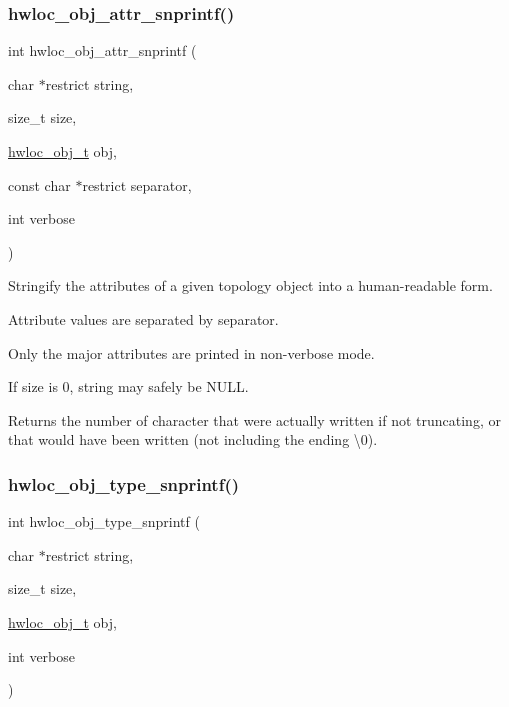 \subsubsection{\texorpdfstring{hwloc\+\_\+obj\+\_\+attr\+\_\+snprintf()}{hwloc\_obj\_attr\_snprintf()}}
{\footnotesize\ttfamily int hwloc\+\_\+obj\+\_\+attr\+\_\+snprintf (\begin{DoxyParamCaption}\item[{char $\ast$restrict}]{string,  }\item[{size\+\_\+t}]{size,  }\item[{\hyperlink{a00185_ga79b8ab56877ef99ac59b833203391c7d}{hwloc\+\_\+obj\+\_\+t}}]{obj,  }\item[{const char $\ast$restrict}]{separator,  }\item[{int}]{verbose }\end{DoxyParamCaption})}



Stringify the attributes of a given topology object into a human-\/readable form. 

Attribute values are separated by {\ttfamily separator}.

Only the major attributes are printed in non-\/verbose mode.

If {\ttfamily size} is 0, {\ttfamily string} may safely be {\ttfamily N\+U\+LL}.

\begin{DoxyReturn}{Returns}
the number of character that were actually written if not truncating, or that would have been written (not including the ending \textbackslash{}0). 
\end{DoxyReturn}
\mbox{\label{a00188_gadb8765c260edea80c52cd06a76639ba4}} 
\subsubsection{\texorpdfstring{hwloc\+\_\+obj\+\_\+type\+\_\+snprintf()}{hwloc\_obj\_type\_snprintf()}}
{\footnotesize\ttfamily int hwloc\+\_\+obj\+\_\+type\+\_\+snprintf (\begin{DoxyParamCaption}\item[{char $\ast$restrict}]{string,  }\item[{size\+\_\+t}]{size,  }\item[{\hyperlink{a00185_ga79b8ab56877ef99ac59b833203391c7d}{hwloc\+\_\+obj\+\_\+t}}]{obj,  }\item[{int}]{verbose }\end{DoxyParamCaption})}




